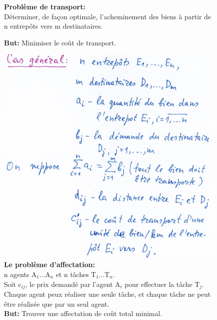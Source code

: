 \begin{figure}[!ht]
	\textbf{Problème de transport:\\}
	Déterminer, de façon optimale, l'acheminement des biens à partir de n entrepôts vers m destinataires.
	\begin{flushleft}
		\textbf{But:} Minimiser le coût de transport.
	\end{flushleft}
	\includegraphics[width=\linewidth,height=0.75\textheight]{notes/algorithme/pb_trans_gen.png}
	\textbf{Le problème d'affectation:\\}
	n agents A$_1$...A$_n$ et n tâches T$_1$...T$_n$.\\
	Soit c$_{ij}$, le prix demandé par l'agent A$_i$ pour effectuer la tâche T$_j$.\\
	Chaque agent peux réaliser une seule tâche, et chaque tâche ne peut être réalisée que par un seul agent.\\
	\textbf{But:} Trouver une affectation de coût total minimal.
\end{figure}
